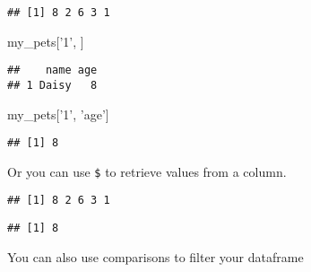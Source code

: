 \documentclass[]{book}
\newenvironment{Shaded}{\begin{snugshade}}{\end{snugshade}}
\newcommand{\CommentTok}[1]{\textcolor[rgb]{0.56,0.35,0.01}{\textit{#1}}}
\newcommand{\DecValTok}[1]{\textcolor[rgb]{0.00,0.00,0.81}{#1}}
\newcommand{\KeywordTok}[1]{\textcolor[rgb]{0.13,0.29,0.53}{\textbf{#1}}}
\newcommand{\NormalTok}[1]{#1}
\newcommand{\OperatorTok}[1]{\textcolor[rgb]{0.81,0.36,0.00}{\textbf{#1}}}
\newcommand{\StringTok}[1]{\textcolor[rgb]{0.31,0.60,0.02}{#1}}
\begin{document}
\begin{verbatim}
## [1] 8 2 6 3 1
\end{verbatim}

\begin{Shaded}
\begin{Highlighting}[]
\NormalTok{my_pets[}\StringTok{'1'}\NormalTok{, ]}
\end{Highlighting}
\end{Shaded}

\begin{verbatim}
##    name age
## 1 Daisy   8
\end{verbatim}

\begin{Shaded}
\begin{Highlighting}[]
\NormalTok{my_pets[}\StringTok{'1'}\NormalTok{, }\StringTok{'age'}\NormalTok{]}
\end{Highlighting}
\end{Shaded}

\begin{verbatim}
## [1] 8
\end{verbatim}

Or you can use \texttt{\$} to retrieve values from a column.

\begin{Shaded}
\end{Shaded}

\begin{verbatim}
## [1] 8 2 6 3 1
\end{verbatim}

\begin{Shaded}
\end{Shaded}

\begin{verbatim}
## [1] 8
\end{verbatim}

You can also use comparisons to filter your dataframe

\begin{Shaded}
\end{Shaded}
\end{document}
